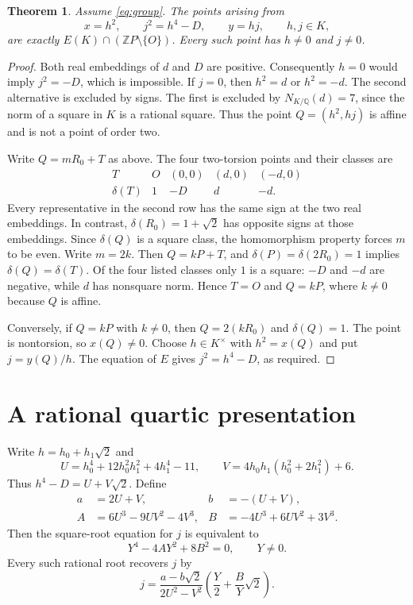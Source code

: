 \documentclass[11pt,a4paper]{article}
\newtheorem{theorem}{Theorem}
\newcommand{\Q}{\mathbb Q}\newcommand{\Z}{\mathbb Z}
\begin{document}
\begin{theorem}\label{thm:chart}
Assume \eqref{eq:group}. The points arising from
\begin{equation}\label{eq:chart}
             x=h^2,\qquad j^2=h^4-D,\qquad y=hj,
             \qquad h,j\in K,
\end{equation}
are exactly $E(K)\cap(\Z P\setminus\{O\})$.
Every such point has $h\ne0$ and $j\ne0$.
\end{theorem}
\begin{proof}
Both real embeddings of $d$ and $D$ are positive. Consequently
$h=0$ would imply $j^2=-D$, which is impossible. If $j=0$,
then $h^2=d$ or $h^2=-d$. The second alternative is excluded
by signs. The first is excluded by $N_{K/\Q}(d)=7$, since the
norm of a square in $K$ is a rational square. Thus the point
$Q=(h^2,hj)$ is affine and is not a point of order two.

Write $Q=mR_0+T$ as above. The four two-torsion points and their
classes are
\[
\begin{array}{c|cccc}
T&O&(0,0)&(d,0)&(-d,0)\\ \hline
\delta(T)&1&-D&d&-d.
\end{array}
\]
Every representative in the second row has the same sign at the
two real embeddings. In contrast,
$\delta(R_0)=1+\sqrt2$ has opposite signs at those embeddings.
Since $\delta(Q)$ is a square class, the homomorphism property
forces $m$ to be even. Write $m=2k$. Then
$Q=kP+T$, and $\delta(P)=\delta(2R_0)=1$ implies
$\delta(Q)=\delta(T)$. Of the four listed classes only $1$ is
a square: $-D$ and $-d$ are negative, while $d$ has nonsquare
norm. Hence $T=O$ and $Q=kP$, where $k\ne0$ because $Q$ is
affine.

Conversely, if $Q=kP$ with $k\ne0$, then $Q=2(kR_0)$ and
$\delta(Q)=1$. The point is nontorsion, so $x(Q)\ne0$. Choose
$h\in K^\times$ with $h^2=x(Q)$ and put $j=y(Q)/h$.
The equation of $E$ gives $j^2=h^4-D$, as required.
\end{proof}

\section{A rational quartic presentation}

Write $h=h_0+h_1\sqrt2$ and
\[
 U=h_0^4+12h_0^2h_1^2+4h_1^4-11,
 \qquad V=4h_0h_1(h_0^2+2h_1^2)+6.
\]
Thus $h^4-D=U+V\sqrt2$. Define
\begin{align*}
 a&=2U+V, & b&=-(U+V),\\
 A&=6U^3-9UV^2-4V^3,
 &B&=-4U^3+6UV^2+3V^3.
\end{align*}
Then the square-root equation for $j$ is equivalent to
\begin{equation}\label{eq:quartic}
              Y^4-4AY^2+8B^2=0,\qquad Y\ne0.
\end{equation}
Every such rational root recovers $j$ by
\begin{equation}\label{eq:recovery}
 j=\frac{a-b\sqrt2}{2U^2-V^2}
                   \left(\frac Y2+\frac BY\sqrt2\right).
\end{equation}
\end{document}

